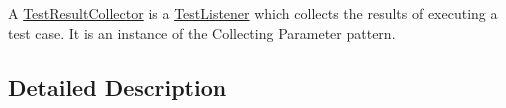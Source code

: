 \begin{DoxyCompactItemize}
\begin{DoxyCompactList}
A \hyperlink{class_test_result_collector}{Test\+Result\+Collector} is a \hyperlink{class_test_listener}{Test\+Listener} which collects the results of executing a test case. It is an instance of the Collecting Parameter pattern. \end{DoxyCompactList}\end{DoxyCompactItemize}


\subsection{Detailed Description}
